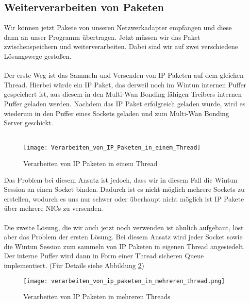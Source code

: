 \newpage

\subsection{Weiterverarbeiten von Paketen}
Wir können jetzt Pakete von unseren Netzwerkadapter empfangen und diese dann an unser Programm übertragen. Jetzt müssen wir das Paket zwischenspeichern und weiterverarbeiten. Dabei sind wir auf zwei verschiedene Lösungswege gestoßen.
\\\\
Der erste Weg ist das Sammeln und Versenden von IP Paketen auf dem gleichen Thread. Hierbei würde ein IP Paket, das derweil noch im Wintun internen Puffer gespeichert ist, aus diesem in den Multi-Wan Bonding fähigen Treibers internen Puffer geladen werden. Nachdem das IP Paket erfolgreich geladen wurde, wird es wiederum in den Puffer eines Sockets geladen und zum Multi-Wan Bonding Server geschickt. 
\\\\
\begin{figure}[H]
    \centering
    \texttt{[image: Verarbeiten\_von\_IP\_Paketen\_in\_einem\_Thread]}
    \caption[Verarbeiten von IP Paketen in einem Thread]{Verarbeiten von IP Paketen in einem Thread}
    \label{driver-process-pakets-one-thread}
\end{figure}
\noindent
Das Problem bei diesem Ansatz ist jedoch, dass wir in diesem Fall die Wintun Session an einen Socket binden. Dadurch ist es nicht möglich mehrere Sockets zu erstellen, wodurch es uns nur schwer oder überhaupt nicht möglich ist IP Pakete über mehrere NICs zu versenden. 
\\\\
Die zweite Lösung, die wir auch jetzt noch verwenden ist ähnlich aufgebaut, löst aber das Problem der ersten Lösung. Bei diesem Ansatz wird jeder Socket sowie die Wintun Session zum sammeln von IP Paketen in eigenen Thread angesiedelt. Der interne Puffer wird dann in Form einer Thread sicheren Queue implementiert. (Für Details siehe Abbildung \ref{driver-process-pakets-many-threads})

\newpage

\begin{figure}[H]
    \centering
    \texttt{[image: verarbeiten\_von\_ip\_paketen\_in\_mehreren\_thread.png]}
    \caption[Verarbeiten von IP Paketen in mehreren Threads]{Verarbeiten von IP Paketen in mehreren Threads}
    \label{driver-process-pakets-many-threads}
\end{figure}
\noindent

